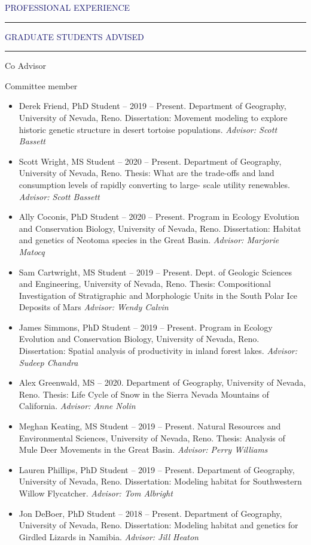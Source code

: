 \documentclass{resume} %
\renewenvironment{rSection}[1]{
\sectionskip
\textcolor{MidnightBlue}{\MakeUppercase{#1}}
\sectionlineskip
\hrule
\begin{list}{}{
\setlength{\leftmargin}{1.5em}
}
\item[]
}{
\end{list}
}
\begin{document}
\begin{rSection}{Professional Experience}
\begin{rSection}{Graduate Students Advised}
\begin{rSubsection}{Co Advisor}{}{}{}
\end{rSubsection}
\begin{rSubsection}{Committee member}{}{}{}
\begin{itemize}
	\item Derek Friend, PhD Student – 2019 – Present. Department of Geography, University of Nevada, Reno. Dissertation: Movement modeling to explore historic genetic structure in desert tortoise populations. \textit{Advisor: Scott Bassett}
\item Scott Wright, MS Student – 2020 – Present. Department of Geography, University of Nevada, Reno. Thesis: What are the trade-offs and land consumption levels of rapidly converting to large- scale utility renewables. \textit{Advisor: Scott Bassett}
\item Ally Coconis, PhD Student –  2020 – Present. Program in Ecology Evolution and Conservation Biology, University of Nevada, Reno. Dissertation: Habitat and genetics of Neotoma species in the Great Basin. \textit{Advisor: Marjorie Matocq}
\item Sam Cartwright, MS Student  – 2019 – Present. Dept. of Geologic Sciences and Engineering, University of Nevada, Reno.  Thesis: Compositional Investigation of Stratigraphic and Morphologic Units in the South Polar Ice Deposits of Mars \textit{Advisor: Wendy Calvin}
\item James Simmons, PhD Student –  2019 – Present. Program in Ecology Evolution and Conservation Biology, University of Nevada, Reno. Dissertation: Spatial analysis of productivity in inland forest lakes. \textit{Advisor: Sudeep Chandra}
\item Alex Greenwald, MS – 2020. Department of Geography, University of Nevada, Reno. Thesis: Life Cycle of Snow in the Sierra Nevada Mountains of California. \textit{Advisor: Anne Nolin}
\item Meghan Keating, MS Student – 2019 – Present. Natural Resources and Environmental Sciences, University of Nevada, Reno. Thesis: Analysis of Mule Deer Movements in the Great Basin. \textit{Advisor: Perry Williams}
\item Lauren Phillips, PhD Student – 2019 – Present. Department of Geography, University of Nevada, Reno. Dissertation: Modeling habitat for Southwestern Willow Flycatcher. \textit{Advisor: Tom Albright}
\item Jon DeBoer, PhD Student – 2018 – Present. Department of Geography, University of Nevada, Reno. Dissertation: Modeling habitat and genetics for Girdled Lizards in Namibia. \textit{Advisor: Jill Heaton}

\end{itemize}
\end{rSubsection}
\end{rSection}
\end{rSection}
\end{document}
